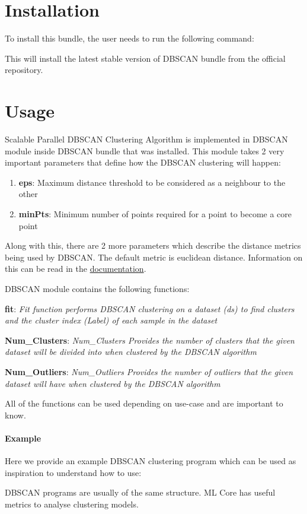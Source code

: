 \section{Installation}

To install this bundle, the user needs to run the following command:



This will install the latest stable version of DBSCAN bundle from the official repository.

\section{Usage}

Scalable Parallel DBSCAN Clustering Algorithm is implemented in DBSCAN module inside DBSCAN bundle that was installed. This module takes 2 very important parameters that define how the DBSCAN clustering will happen: 

\begin{enumerate}
    \item \textbf{eps}: Maximum distance threshold to be considered as a neighbour to the other
    \item \textbf{minPts}: Minimum number of points required for a point to become a core point
\end{enumerate}

Along with this, there are 2 more parameters which describe the distance metrics being used by DBSCAN. The default metric is euclidean distance. Information on this can be read in the \href{https://cdn.hpccsystems.com/pdf/ml/dbscan.pdf}{documentation}.

DBSCAN module contains the following functions:

\textbf{fit}: \textit{Fit function performs DBSCAN clustering on a dataset (ds) to find clusters and the cluster index (Label) of each sample in the dataset}

\textbf{Num\_Clusters}: \textit{Num\_Clusters Provides the number of clusters that the given dataset will be divided into when clustered by the DBSCAN algorithm}

\textbf{Num\_Outliers}: \textit{Num\_Outliers Provides the number of outliers that the given dataset will have when clustered by the DBSCAN algorithm}

All of the functions can be used depending on use-case and are important to know.

\paragraph{Example}

Here we provide an example DBSCAN clustering program which can be used as inspiration to understand how to use:



DBSCAN programs are usually of the same structure. ML Core has useful metrics to analyse clustering models.